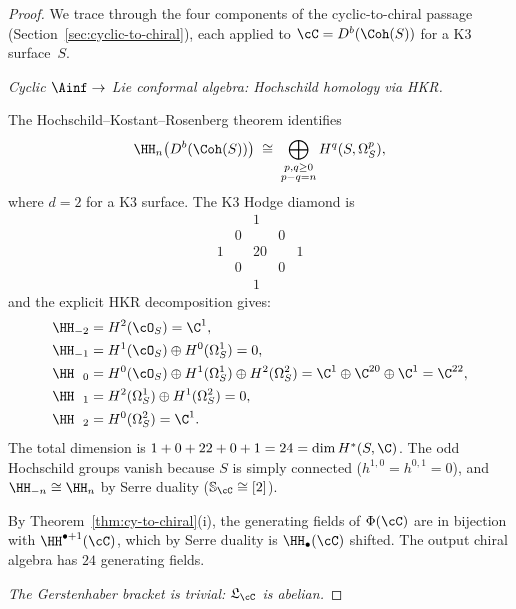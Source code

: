 \begin{proof}
We trace through the four components of the cyclic-to-chiral passage (Section~\ref{sec:cyclic-to-chiral}), each applied to $\cC = D^b(\Coh(S))$ for a K3 surface~$S$.

\medskip\noindent
\noindent\emph{Cyclic $\Ainf \to$ Lie conformal algebra: Hochschild homology via HKR.}

\smallskip\noindent
The Hochschild--Kostant--Rosenberg theorem identifies
\[
 \HH_n\bigl(D^b(\Coh(S))\bigr) \;\cong\; \bigoplus_{\substack{p, q \geq 0 \\ p - q = n}} H^q(S, \Omega^p_S),
\]
where $d = 2$ for a K3 surface. The K3 Hodge diamond is
\[
 \begin{array}{ccccc}
 & & 1 & & \\
 & 0 & & 0 & \\
 1 & & 20 & & 1 \\
 & 0 & & 0 & \\
 & & 1 & &
 \end{array}
\]
and the explicit HKR decomposition gives:
\begin{align*}
 \HH_{-2} &= H^2(\cO_S) = \C^1, \\
 \HH_{-1} &= H^1(\cO_S) \oplus H^0(\Omega^1_S) = 0, \\
 \HH_{\phantom{-}0} &= H^0(\cO_S) \oplus H^1(\Omega^1_S) \oplus H^2(\Omega^2_S)
 = \C^1 \oplus \C^{20} \oplus \C^1 = \C^{22}, \\
 \HH_{\phantom{-}1} &= H^2(\Omega^1_S) \oplus H^1(\Omega^2_S) = 0, \\
 \HH_{\phantom{-}2} &= H^0(\Omega^2_S) = \C^1.
\end{align*}
The total dimension is $1 + 0 + 22 + 0 + 1 = 24 = \dim H^*(S, \C)$. The odd Hochschild groups vanish because $S$ is simply connected ($h^{1,0} = h^{0,1} = 0$), and $\HH_{-n} \cong \HH_n$ by Serre duality ($\mathbb{S}_\cC \cong [2]$).

By Theorem~\ref{thm:cy-to-chiral}(i), the generating fields of $\Phi(\cC)$ are in bijection with $\HH^{\bullet+1}(\cC)$, which by Serre duality is $\HH_\bullet(\cC)$ shifted. The output chiral algebra has $24$ generating fields.

\medskip\noindent
\noindent\emph{The Gerstenhaber bracket is trivial: $\mathfrak{L}_\cC$ is abelian.}


\end{proof}

